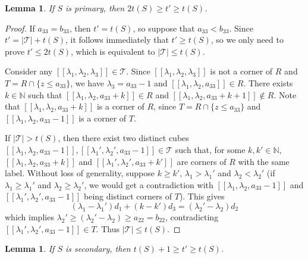 \documentclass[12pt]{article}
\newtheorem{lemma}[thm]{Lemma}
\theoremstyle{remark}
\begin{document}
\begin{lemma}\label{lemma_type-corners_primary}
    If $S$ is primary, then $2t(S) \geq t' \geq t(S)$.
\end{lemma}
\begin{proof}
If $a_{33} = b_{33}$, then $t' = t(S)$, so suppose that $a_{33} < b_{33}$. Since $t' = | \mathcal{T}| + t(S)$, it follows immediately that $t' \geq  t(S)$, so we only need to prove $t' \leq 2t(S) $, which is equivalent to $|\mathcal{T}| \leq t(S)$.

Consider any $[[\lambda_1,\lambda_2,\lambda_3]] \in \mathcal{T}$. Since $[[\lambda_1,\lambda_2,\lambda_3]]$ is not a corner of $R$ and $T = R \cap \{z \leq a_{33}\} $, we have $\lambda_3 = a_{33}-1$ and $[[\lambda_1,\lambda_2,a_{33}]] \in R$. There exists $k \in \mathbb{N}$ such that $[[\lambda_1,\lambda_2,a_{33}+k]] \in R$ and $[[\lambda_1,\lambda_2,a_{33}+k+1]] \notin R$. Note that $[[\lambda_1,\lambda_2,a_{33}+k]]$ is a corner of $R$, since $T = R \cap \{z \leq a_{33}\}$ and $[[\lambda_1,\lambda_2,a_{33}-1]]$ is a corner of $T$. 

If  $| \mathcal{T}| > t(S)$, then there exist two distinct cubes $[[\lambda_1,\lambda_2,a_{33}-1]], [[\lambda_1',\lambda_2',a_{33}-1]] \in \mathcal{T}$ such that, for some $k, k' \in \mathbb{N}$, $[[\lambda_1,\lambda_2,a_{33}+k]]$ and $[[\lambda_1',\lambda_2',a_{33}+k']]$ are corners of $R$ with the same label. Without loss of generality, suppose $k \geq k'$, $\lambda_1 > \lambda_1'$ and $\lambda_2 < \lambda_2'$ (if $\lambda_1 \geq \lambda_1'$ and $\lambda_2 \geq \lambda_2'$, we would get a contradiction with $[[\lambda_1,\lambda_2,a_{33}-1]]$ and $[[\lambda_1',\lambda_2',a_{33}-1]]$ being distinct corners of $T$). This gives
\begin{equation}
    (\lambda_1 - \lambda_1')d_1 + (k-k')d_3 = (\lambda_2'-\lambda_2)d_2
\end{equation}
which implies $\lambda_2' \geq (\lambda_2'-\lambda_2) \geq a_{22} = b_{22}$, contradicting $[[\lambda_1',\lambda_2',a_{33}-1]] \in T$. Thus $|\mathcal{T}| \leq t(S)$.    
\end{proof}

\begin{lemma}\label{lemma_type-corners_secondary}
    If $S$ is secondary, then $t(S)+1 \geq t' \geq  t(S)$.
\end{lemma}
\end{document}
